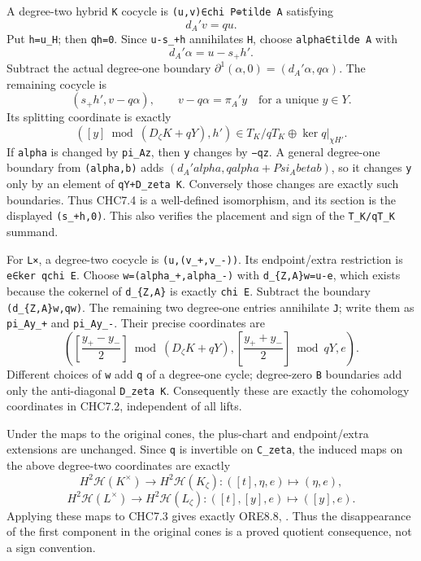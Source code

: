 A degree-two hybrid \texttt{K} cocycle is
\texttt{(u,v)∈chi\ P\textquotesingle{}⊕tilde\ A} satisfying \[
d_A'v=q u.
\] Put \texttt{h\textquotesingle{}=u\textbar{}\_H}; then
\texttt{qh\textquotesingle{}=0}. Since
\texttt{u-s\_+h\textquotesingle{}} annihilates \texttt{H}, choose
\texttt{alpha∈tilde\ A} with \[
d_A'\alpha=u-s_+h'.
\] Subtract the actual degree-one boundary
\(\partial^1(\alpha,0)=(d_A'\alpha,q\alpha)\). The remaining cocycle is
\[
(s_+h',v-q\alpha),\qquad v-q\alpha=\pi_A'y
\quad\text{for a unique }y\in Y.
\] Its splitting coordinate is exactly \[
([y]\bmod(D_\zeta K+qY),h')
\in T_K/qT_K\oplus\ker q|_{\chi H'}.
\tag{CHC7.4}
\] If \texttt{alpha} is changed by \texttt{pi\_A\textquotesingle{}z},
then \texttt{y} changes by \texttt{−qz}. A general degree-one boundary
from \texttt{(alpha,b)} adds \((d_A'alpha,qalpha+Psi_A beta b)\), so it
changes \texttt{y} only by an element of \texttt{qY+D\_zeta\ K}.
Conversely those changes are exactly such boundaries. Thus CHC7.4 is a
well-defined isomorphism, and its section is the displayed
\texttt{(s\_+h\textquotesingle{},0)}. This also verifies the placement
and sign of the \texttt{T\_K/qT\_K} summand.

For \texttt{L×}, a degree-two cocycle is \texttt{(u,(v\_+,v\_-))}. Its
endpoint/extra restriction is
\texttt{e∈ker\ q\textbar{}chi\ E\textquotesingle{}}. Choose
\texttt{w=(alpha\_+,alpha\_-)} with
\texttt{d\_\{Z,A\}\textquotesingle{}w=u-e}, which exists because the
cokernel of \texttt{d\_\{Z,A\}\textquotesingle{}} is exactly
\texttt{chi\ E\textquotesingle{}}. Subtract the boundary
\texttt{(d\_\{Z,A\}\textquotesingle{}w,qw)}. The remaining two
degree-one entries annihilate \texttt{J}; write them as
\texttt{pi\_A\textquotesingle{}y\_+} and
\texttt{pi\_A\textquotesingle{}y\_-}. Their precise coordinates are \[
\left(\left[\frac{y_+-y_-}{2}\right]\bmod(D_\zeta K+qY),
\left[\frac{y_++y_-}{2}\right]\bmod qY,e\right).
\tag{CHC7.5}
\] Different choices of \texttt{w} add \texttt{q} of a degree-one cycle;
degree-zero \texttt{B} boundaries add only the anti-diagonal
\texttt{D\_zeta\ K}. Consequently these are exactly the cohomology
coordinates in CHC7.2, independent of all lifts.

Under the maps to the original cones, the plus-chart and endpoint/extra
extensions are unchanged. Since \texttt{q} is invertible on
\texttt{C\_zeta}, the induced maps on the above degree-two coordinates
are exactly \[
H^2\mathscr H(K^\times)\to H^2\mathscr H(K_\zeta):
([t],\eta,e)\longmapsto(\eta,e),
\] \[
H^2\mathscr H(L^\times)\to H^2\mathscr H(L_\zeta):
([t],[y],e)\longmapsto([y],e).
\tag{CHC7.6}
\] Applying these maps to CHC7.3 gives exactly ORE8.8,
. Thus the disappearance of the first
component in the original cones is a proved quotient consequence, not a
sign convention.

